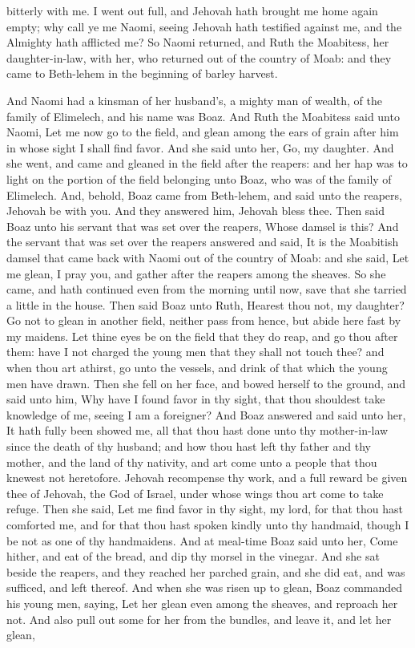 bitterly with me. I went out full, and Jehovah hath brought me home again empty; why call ye me Naomi, seeing Jehovah hath testified against me, and the Almighty hath afflicted me? So Naomi returned, and Ruth the Moabitess, her daughter-in-law, with her, who returned out of the country of Moab: and they came to Beth-lehem in the beginning of barley harvest. 

And Naomi had a kinsman of her husband’s, a mighty man of wealth, of the family of Elimelech, and his name was Boaz. And Ruth the Moabitess said unto Naomi, Let me now go to the field, and glean among the ears of grain after him in whose sight I shall find favor. And she said unto her, Go, my daughter. And she went, and came and gleaned in the field after the reapers: and her hap was to light on the portion of the field belonging unto Boaz, who was of the family of Elimelech. And, behold, Boaz came from Beth-lehem, and said unto the reapers, Jehovah be with you. And they answered him, Jehovah bless thee. Then said Boaz unto his servant that was set over the reapers, Whose damsel is this? And the servant that was set over the reapers answered and said, It is the Moabitish damsel that came back with Naomi out of the country of Moab: and she said, Let me glean, I pray you, and gather after the reapers among the sheaves. So she came, and hath continued even from the morning until now, save that she tarried a little in the house.  Then said Boaz unto Ruth, Hearest thou not, my daughter? Go not to glean in another field, neither pass from hence, but abide here fast by my maidens. Let thine eyes be on the field that they do reap, and go thou after them: have I not charged the young men that they shall not touch thee? and when thou art athirst, go unto the vessels, and drink of that which the young men have drawn. Then she fell on her face, and bowed herself to the ground, and said unto him, Why have I found favor in thy sight, that thou shouldest take knowledge of me, seeing I am a foreigner? And Boaz answered and said unto her, It hath fully been showed me, all that thou hast done unto thy mother-in-law since the death of thy husband; and how thou hast left thy father and thy mother, and the land of thy nativity, and art come unto a people that thou knewest not heretofore. Jehovah recompense thy work, and a full reward be given thee of Jehovah, the God of Israel, under whose wings thou art come to take refuge. Then she said, Let me find favor in thy sight, my lord, for that thou hast comforted me, and for that thou hast spoken kindly unto thy handmaid, though I be not as one of thy handmaidens.  And at meal-time Boaz said unto her, Come hither, and eat of the bread, and dip thy morsel in the vinegar. And she sat beside the reapers, and they reached her parched grain, and she did eat, and was sufficed, and left thereof. And when she was risen up to glean, Boaz commanded his young men, saying, Let her glean even among the sheaves, and reproach her not. And also pull out some for her from the bundles, and leave it, and let her glean, 